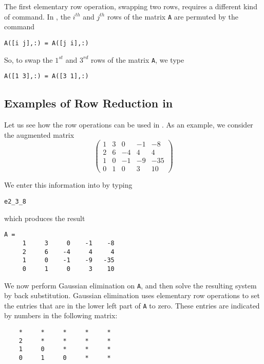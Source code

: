 \documentclass{ximera}
\begin{document}
The first elementary row operation, swapping two rows, requires
a different kind of \Matlab command.  In \Matlabp, the $i^{th}$
and $j^{th}$ rows of the matrix {\tt A} are permuted by the
command
\begin{verbatim}
A([i j],:) = A([j i],:)
\end{verbatim}
So, to swap the $1^{st}$ and $3^{rd}$ rows of the matrix
{\tt A}, we type
\begin{verbatim}
A([1 3],:) = A([3 1],:)
\end{verbatim}  

\subsection*{Examples of Row Reduction in \Matlab}

Let us see how the row operations can be used in \Matlabp.  As
an example, we consider the augmented matrix
\begin{equation*}  \label{examp4}
\left(
\begin{array}{rrrr|r}
 1  &  3  &  0  & -1  &  -8\\
 2  &  6  & -4  &  4  &   4\\
 1  &  0  & -1  & -9  & -35\\
 0  &  1  &  0  &  3  &  10
\end{array}
\right)
\end{equation*}

We enter this information into \Matlab by typing
\begin{verbatim}
e2_3_8
\end{verbatim}
which produces the result
\begin{verbatim}
A =
     1     3     0    -1    -8
     2     6    -4     4     4
     1     0    -1    -9   -35
     0     1     0     3    10
\end{verbatim}

We now perform Gaussian elimination on {\tt A}, and then solve the 
resulting system by back substitution.  Gaussian elimination uses 
elementary row operations to set the entries that are in the lower 
left part of {\tt A} to zero. These entries are indicated by
numbers in the following matrix:
\begin{verbatim}
    *     *     *     *     *
    2     *     *     *     *
    1     0     *     *     *
    0     1     0     *     *
\end{verbatim}
\end{document}
